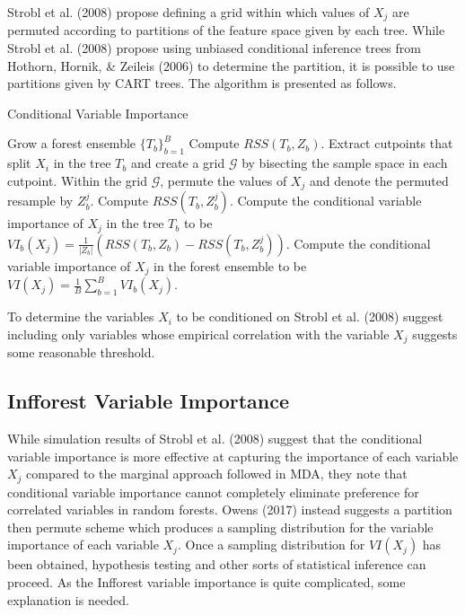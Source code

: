 \documentclass[12pt,twoside]{reedthesis}
\theoremstyle{definition}
\theoremstyle{definition}
\theoremstyle{definition}
\theoremstyle{remark}
\begin{document}
Strobl et al. (2008) propose defining a grid within which values of
\(X_j\) are permuted according to partitions of the feature space given
by each tree. While Strobl et al. (2008) propose using unbiased
conditional inference trees from Hothorn, Hornik, \& Zeileis (2006) to
determine the partition, it is possible to use partitions given by CART
trees. The algorithm is presented as follows. \par
\begin{algorithm}
    \caption{Conditional Variable Importance} \label{conditional variable importance}
      \begin{algorithmic}[1]
        \State Grow a forest ensemble $\{T_b\}_{b=1}^B$
            \State Compute $RSS(T_b,Z_b)$.
            \State Extract cutpoints that split $X_i$ in the tree $T_b$ and create a grid $\mathcal{G}$ by bisecting the sample space in each cutpoint.
            \EndFor
            \State Within the grid $\mathcal{G}$, permute the values of $X_j$ and denote the permuted resample by $Z_b^j$.
            \State Compute $RSS(T_b,Z_b^j)$.
            \State Compute the conditional variable importance of $X_j$ in the tree $T_b$ to be $VI_b(X_j)=\frac{1}{|Z_b|}\left(RSS(T_b,Z_b)-RSS(T_b,Z_b^j)\right)$.
            \EndFor
            \State Compute the conditional variable importance of $X_j$ in the forest ensemble to be $VI(X_j)=\frac{1}{B}\sum_{b=1}^B VI_b(X_j)$.
          \EndFor
      \end{algorithmic}
  \end{algorithm}
To determine the variables \(X_i\) to be conditioned on Strobl et al.
(2008) suggest including only variables whose empirical correlation with
the variable \(X_j\) suggests some reasonable threshold. \par

\subsection{Infforest Variable
Importance}\label{infforest-variable-importance}

While simulation results of Strobl et al. (2008) suggest that the
conditional variable importance is more effective at capturing the
importance of each variable \(X_j\) compared to the marginal approach
followed in MDA, they note that conditional variable importance cannot
completely eliminate preference for correlated variables in random
forests. Owens (2017) instead suggests a partition then permute scheme
which produces a sampling distribution for the variable importance of
each variable \(X_j\). Once a sampling distribution for \(VI(X_j)\) has
been obtained, hypothesis testing and other sorts of statistical
inference can proceed. As the Infforest variable importance is quite
complicated, some explanation is needed. \par
\end{document}
